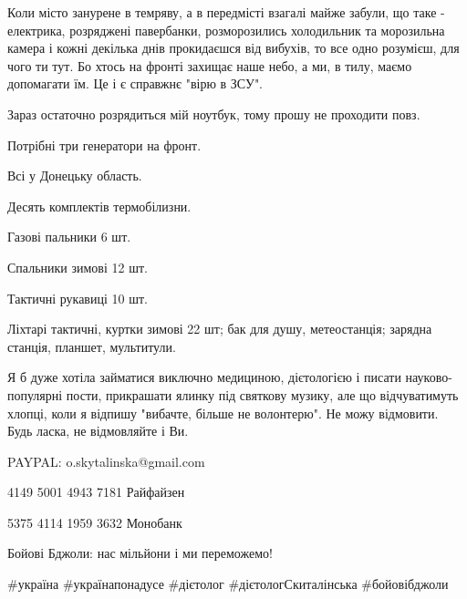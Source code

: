 Коли місто занурене в темряву, а в передмісті взагалі майже забули, що таке -
електрика, розряджені павербанки, розморозились холодильник та морозильна
камера і кожні декілька днів прокидаєшся від вибухів, то все одно розумієш, для
чого ти тут. Бо хтось на фронті захищає наше небо, а ми, в тилу, маємо
допомагати їм. Це і є справжнє "вірю в ЗСУ".

Зараз остаточно розрядиться мій ноутбук, тому прошу не проходити повз.

Потрібні три генератори на фронт. 

Всі у Донецьку область.

Десять комплектів термобілизни.

Газові пальники 6 шт.

Спальники зимові 12 шт.

Тактичні рукавиці 10 шт.

Ліхтарі тактичні, куртки зимові 22 шт; бак для душу, метеостанція; зарядна
станція, планшет, мультитули.

Я б дуже хотіла займатися виключно медициною, дієтологією і писати
науково-популярні пости, прикрашати ялинку під святкову музику, але що
відчуватимуть хлопці, коли я відпишу "вибачте, більше не волонтерю". Не можу
відмовити. Будь ласка, не відмовляйте і Ви.

PAYPAL: o.skytalinska@gmail.com

4149 5001 4943 7181 Райфайзен

5375 4114 1959 3632 Монобанк

Бойові Бджоли: нас мільйони і ми переможемо!

\#україна \#українапонадусе \#дієтолог \#дієтологСкиталінська \#бойовібджоли

